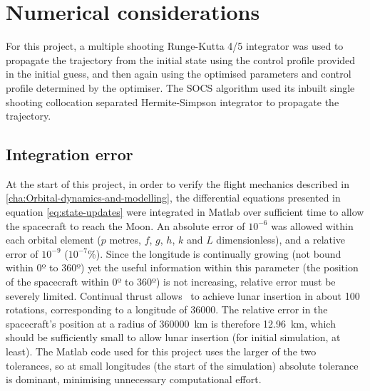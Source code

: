 
\section{Numerical considerations} \label{sec:Numerical-considerations}


For this project, a multiple shooting Runge-Kutta 4/5 integrator was used to propagate the trajectory from the initial state using the control profile provided in the initial guess, and then again using the optimised parameters and control profile determined by the optimiser. The SOCS algorithm used its inbuilt single shooting collocation separated Hermite-Simpson integrator \parencite{Betts2010} to propagate the trajectory.


\subsection{Integration error} \label{sub:Integration-error}

At the start of this project, in order to verify the flight mechanics described in \autoref{cha:Orbital-dynamics-and-modelling}, the differential equations presented in equation \eqref{eq:state-updates} were integrated in Matlab over sufficient time to allow the spacecraft to reach the Moon. An absolute error of $10^{-6}$ was allowed within each orbital element ($p$ metres, $f$, $g$, $h$, $k$ and $L$ dimensionless), and a relative error of $10^{-9}$ ($10^{-7}$\%). Since the longitude is continually growing (not bound within 0º to 360º) yet the useful information within this parameter (the position of the spacecraft within 0º to 360º) is not increasing, relative error must be severely limited. Continual thrust allows \BW\ to achieve lunar insertion in about 100 rotations, corresponding to a longitude of 36000\degrees. The relative error in the spacecraft's position at a radius of 360000~km is therefore 12.96~km, which should be sufficiently small to allow lunar insertion (for initial simulation, at least). The Matlab code used for this project uses the larger of the two tolerances, so at small longitudes (the start of the simulation) absolute tolerance is dominant, minimising unnecessary computational effort.

